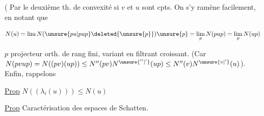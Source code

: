 (  Par le deuxième th. de convexité si $v$ et $u$ sont   cpts. On s'y ramène facilement, en notant que 

\[
N(u)=\lim N(\unsure{pu|pup}\deleted{\unsure{p}})\unsure{p}=\lim_p N(pup)=\lim_p N(up)
\]

$p$ projecteur orth. de rang fini, variant en filtrant croissant. (Car $N(pvup)=N((pv)(up))\leq N''(pv)N^{\unsure{''|'}}(up)\leq N''(v)N^{\unsure{\circ|'}}(u)$). Enfin, rappelons

\uline{Prop} $N((\lambda_i(u)))\leq N(u)$

\uline{Prop} Caractérisation des espaces de Schatten.
